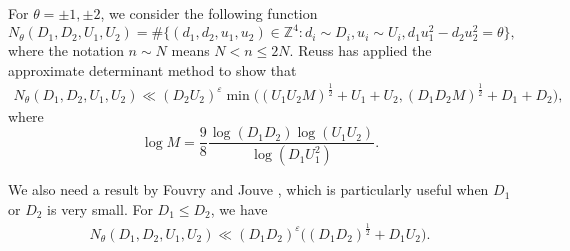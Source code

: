 \documentclass[reqno, 11pt, twoside]{amsart}
\numberwithin{equation}{section}
\theoremstyle{definition}
\renewcommand{\leq}{\leqslant}
\newcommand{\eps}{\varepsilon}
\newcommand{\ZZ}{\mathbb{Z}}
\begin{document}
For $\theta = \pm1, \pm 2$, we consider the following function
$$N_\theta (D_1, D_2, U_1, U_2) = \# \{ (d_1, d_2, u_1, u_2) \in \ZZ^4: d_i \sim D_i, u_i \sim U_i, d_1u_1^2 - d_2u_2^2 = \theta\},$$
where the notation $n \sim N$ means $N < n \leq 2N$.
Reuss \cite[Theorem 5]{Reu} has applied the approximate determinant method to show that
\begin{align}\label{thm-Reu}
	N_\theta (D_1, D_2, U_1, U_2) \ll (D_2 U_2)^\eps \min \big((U_1U_2M)^\frac{1}{2} + U_1 + U_2, (D_1D_2M)^\frac{1}{2} + D_1 + D_2 \big), 
\end{align}
where 
$$\log M = \frac{9}{8} \frac{\log (D_1D_2) \log(U_1U_2)}{\log(D_1U_1^2)}.$$

We also need a result by Fouvry and Jouve \cite[Lemma 8]{FoJo}, which is particularly useful when $D_1$ or $D_2$ is very small.
For $D_1 \leq D_2$, we have
\begin{eqnarray}\label{thm-FJ}
	N_\theta (D_1, D_2, U_1, U_2) \ll (D_1D_2)^\eps \big((D_1D_2)^\frac{1}{2} + D_1U_2\big).
\end{eqnarray}
\end{document}
